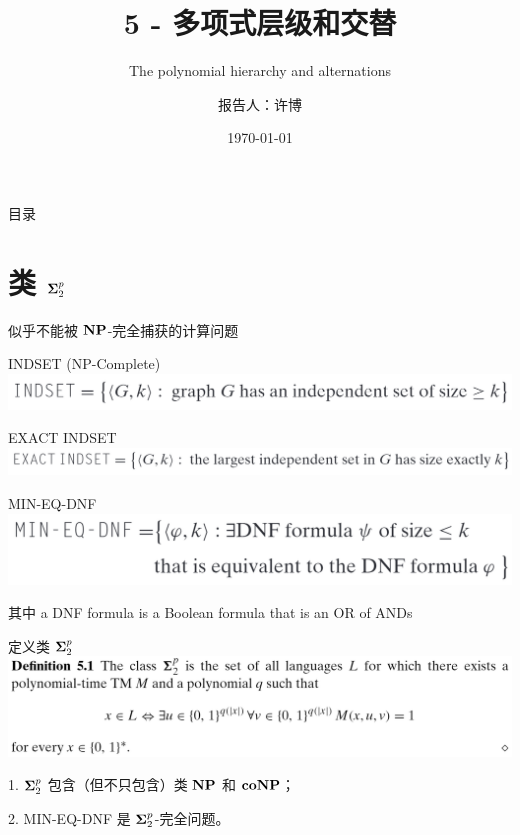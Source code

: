 \documentclass[UTF8,aspectratio=169,mathserif]{beamer}
\title{5 - 多项式层级和交替}
\subtitle{The polynomial hierarchy and alternations}
\author{报告人：许博}
\date{\today}
\begin{document}
	
	\begin{frame}
		\titlepage
	\end{frame}
	
	\begin{frame}{目录}
		\tableofcontents
	\end{frame}
	
	\section{类 ${\bf\Sigma}_2^p$}
	\begin{frame}{似乎不能被 $\bf NP$-完全捕获的计算问题}
		\begin{block}{INDSET (NP-Complete)}
			\includegraphics[width=0.6\linewidth]{../5 & 6/note.assets/image-20210426152232421.png}
		\end{block}
		
		\begin{block}{EXACT INDSET}
			\includegraphics[width=0.7\linewidth]{../5 & 6/note.assets/image-20210426152349887.png}
		\end{block}
		
		\begin{block}{MIN-EQ-DNF}
			\includegraphics[width=0.6\linewidth]{../5 & 6/note.assets/image-20210426152757453.png}
			
			其中 a DNF formula is a Boolean formula that is an OR of ANDs 
		\end{block}
	\end{frame}
	
	\begin{frame}{定义类 ${\bf\Sigma}_2^p$}
		\includegraphics[width=\linewidth]{../5 & 6/note.assets/image-20210426154842170.png}\newline
		
		1. ${\bf\Sigma}_2^p$ 包含（但不只包含）类 $\bf NP$ 和 $\bf coNP$；
		
		2. MIN-EQ-DNF 是 ${\bf\Sigma}_2^p$-完全问题。
	\end{frame}
	
\end{document}
